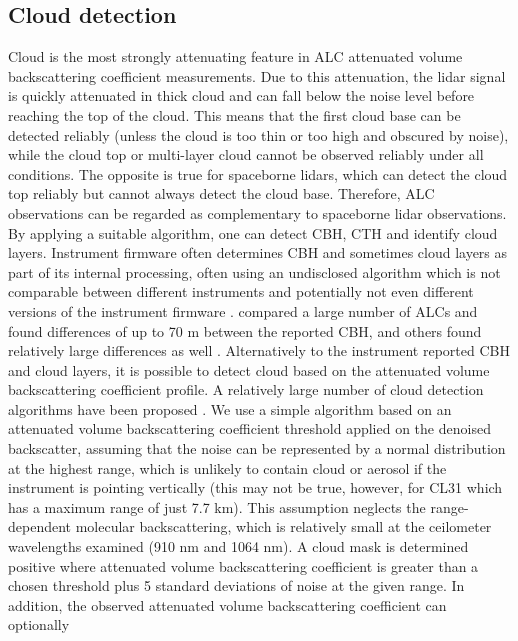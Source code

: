 \subsection{Cloud detection}
\label{sec:3:cloud-detection}

Cloud is the most strongly attenuating feature in ALC attenuated volume backscattering coefficient measurements.
Due to this attenuation, the lidar signal is quickly
attenuated in thick cloud and can fall below the noise level before
reaching the top of the cloud. This means that the first cloud base can be
detected reliably (unless the cloud is too thin or too high and obscured by noise), while the cloud top or multi-layer cloud cannot be observed reliably under all conditions. The opposite is true for spaceborne lidars, which can detect the cloud top
reliably but cannot always detect the cloud base. Therefore, ALC observations can be regarded
as complementary to spaceborne lidar observations.
By applying a suitable algorithm, one can detect CBH, CTH and identify cloud layers. Instrument firmware
often determines CBH and sometimes cloud layers as part of its internal
processing, often using an undisclosed algorithm which is not comparable
between different instruments and potentially not even different versions
of the instrument firmware \citep{kotthaus2016}. \cite{mattis2016} compared a large
number of ALCs and found differences of up to 70 m between the reported CBH,
and others found relatively large differences as well \citep{liu2015a,silber2018}.
Alternatively to the instrument reported CBH and cloud layers, it is possible
to detect cloud based on the attenuated volume backscattering coefficient profile. A relatively large number of
cloud detection algorithms have been proposed
\citep{wang2001,morille2007,martucci2010,tricht2014,silber2018,cromwell2019}.
We use a simple algorithm based on an attenuated volume backscattering coefficient threshold applied
on the denoised backscatter, assuming that the noise can be
represented by a normal distribution at the highest range, which is unlikely
to contain cloud or aerosol if the instrument is pointing vertically
(this may not be true, however, for CL31 which has a maximum range of just 7.7 km).
This assumption neglects the range-dependent molecular backscattering, which is
relatively small at the ceilometer wavelengths examined (910 nm and 1064 nm).
A cloud mask is determined positive where attenuated volume backscattering coefficient is greater than a
chosen threshold plus 5 standard deviations of noise at the given range.
In addition, the observed attenuated volume backscattering coefficient can optionally
